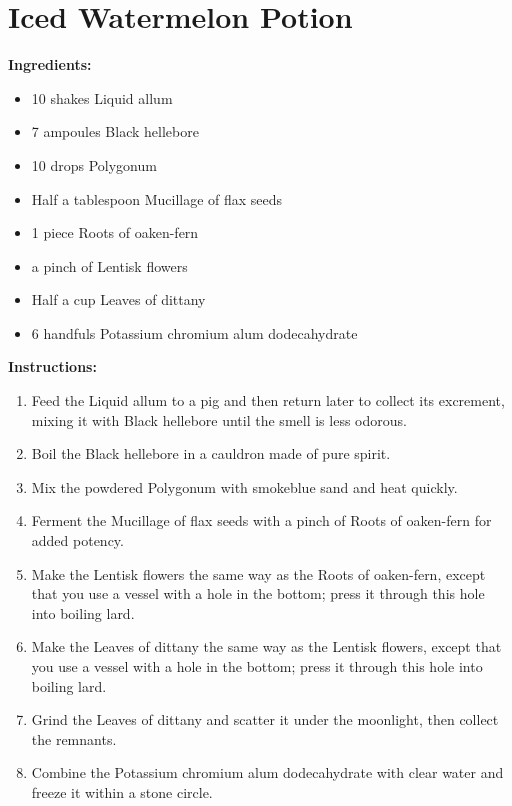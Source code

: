 \documentclass{article}
\begin{document}
\newpage
\section*{Iced Watermelon Potion}

\textbf{Ingredients:}

\begin{itemize}
  \item 10 shakes Liquid allum
  \item 7 ampoules Black hellebore
  \item 10 drops Polygonum
  \item Half a tablespoon Mucillage of flax seeds
  \item 1 piece Roots of oaken-fern
  \item a pinch of Lentisk flowers
  \item Half a cup Leaves of dittany
  \item 6 handfuls Potassium chromium alum dodecahydrate
\end{itemize}

\textbf{Instructions:}

\begin{enumerate}
  \item Feed the Liquid allum to a pig and then return later to collect its excrement, mixing it with Black hellebore until the smell is less odorous.
  \item Boil the Black hellebore in a cauldron made of pure spirit.
  \item Mix the powdered Polygonum with smokeblue sand and heat quickly.
  \item Ferment the Mucillage of flax seeds with a pinch of Roots of oaken-fern for added potency.
  \item Make the Lentisk flowers the same way as the Roots of oaken-fern, except that you use a vessel with a hole in the bottom; press it through this hole into boiling lard.
  \item Make the Leaves of dittany the same way as the Lentisk flowers, except that you use a vessel with a hole in the bottom; press it through this hole into boiling lard.
  \item Grind the Leaves of dittany and scatter it under the moonlight, then collect the remnants.
  \item Combine the Potassium chromium alum dodecahydrate with clear water and freeze it within a stone circle.
\end{enumerate}
\end{document}
